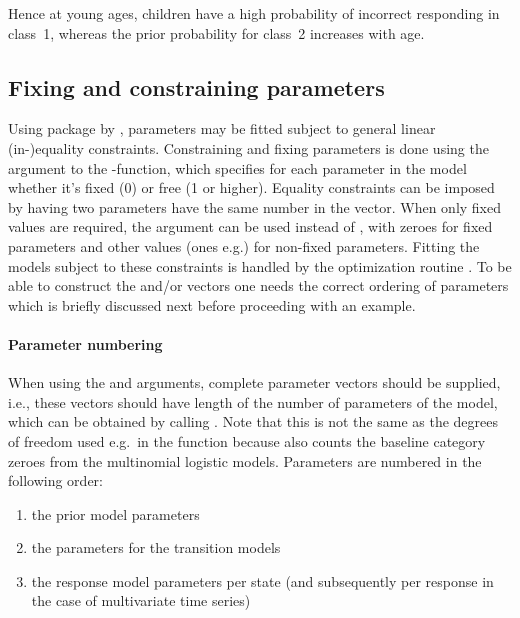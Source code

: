 \documentclass[article]{jss}
\begin{document}
Hence at young ages, children have a high probability of incorrect 
responding in class~1, whereas the prior probability for class~2 
increases with age. 


\subsection{Fixing and constraining parameters}

Using package  by \citet{Tamura2009}, parameters may be
fitted subject to general linear (in-)equality constraints.
Constraining and fixing parameters is done using the 
argument to the -function, which specifies for each
parameter in the model whether it's fixed (0) or free (1 or higher).
Equality constraints can be imposed by having two parameters have the
same number in the  vector.  When only fixed values are
required, the  argument can be used instead of
, with zeroes for fixed parameters and other values (ones
e.g.) for non-fixed parameters.  Fitting the models subject to these
constraints is handled by the optimization routine .  To
be able to construct the  and/or  vectors one
needs the correct ordering of parameters which is briefly discussed
next before proceeding with an example.

\paragraph{Parameter numbering} When using the  and
 arguments, complete parameter vectors should be supplied,
i.e., these vectors should have length of the number of parameters of
the model, which can be obtained by calling .  Note
that this is not the same as the degrees of freedom used e.g.\ in the
 function because  also counts the baseline
category zeroes from the multinomial logistic models.  Parameters are
numbered in the following order:
\begin{enumerate}
	\item  the prior model parameters
	\item  the parameters for the transition models
	\item  the response model parameters per state (and subsequently
	per response in the case of multivariate time series)
\end{enumerate}
\end{document}
